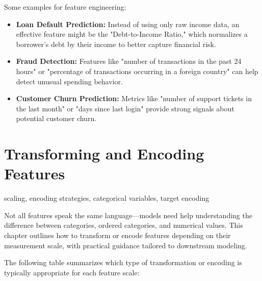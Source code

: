 \documentclass[12pt,openany, draft]{book}
\begin{document}
Some examples for feature engineering:
\begin{itemize}
    \item \textbf{Loan Default Prediction:} Instead of using only raw income data, an effective feature might be the "Debt-to-Income Ratio," which normalizes a borrower’s debt by their income to better capture financial risk.
    \item \textbf{Fraud Detection:} Features like "number of transactions in the past 24 hours" or "percentage of transactions occurring in a foreign country" can help detect unusual spending behavior.
    \item \textbf{Customer Churn Prediction:} Metrics like "number of support tickets in the last month" or "days since last login" provide strong signals about potential customer churn.
\end{itemize}



\section{Transforming and Encoding Features}

\begin{keywordsbox}
scaling, encoding strategies, categorical variables, target encoding \end{keywordsbox}

Not all features speak the same language—models need help understanding the difference between categories, ordered categories, and numerical values. This chapter outlines how to transform or encode features depending on their measurement scale, with practical guidance tailored to downstream modeling.
\newline

The following table summarizes which type of transformation or encoding is typically appropriate for each feature scale:
\end{document}
